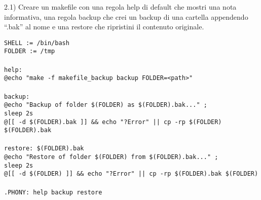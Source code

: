 \begin{flushleft}
  2.1) Creare un makefile con una regola help di default che mostri una nota 
  informativa, una regola backup che crei un backup di una cartella appendendo 
  “.bak” al nome e una restore che ripristini il contenuto originale.
  
  \texttt{SHELL := /bin/bash\\
  FOLDER := /tmp\\
  \tab \\
  help: \\
  \tab	@echo "make -f makefile\_backup backup FOLDER=<path>"\\
  \tab \\
  backup:\\
  	\tab @echo "Backup of folder \$(FOLDER) as \$(FOLDER).bak..." ; \\
    \tab sleep 2s\\
  	\tab @[[ -d \$(FOLDER).bak ]] \&\& echo "?Error" || cp -rp \$(FOLDER) \$(FOLDER).bak\\
    \tab \\
  restore: \$(FOLDER).bak\\
  	\tab @echo "Restore of folder  \$(FOLDER) from \$(FOLDER).bak..." ; \\
    \tab sleep 2s\\
  	\tab @[[ -d \$(FOLDER) ]] \&\& echo "?Error" || cp -rp \$(FOLDER).bak \$(FOLDER)\\
  \tab \\
  .PHONY: help backup restore\\
  } 
\end{flushleft}
